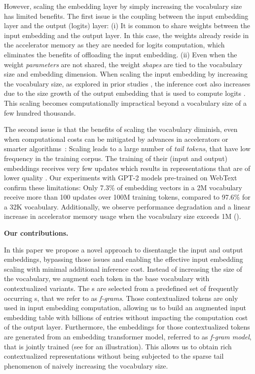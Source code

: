 However, scaling the embedding layer by simply increasing the vocabulary size has limited benefits. The first issue is the coupling between the input embedding layer and the output (logits) layer:  (i) It is common to share weights between the input embedding and the output layer. In this case, the weights already reside in the accelerator memory as they are needed for logits computation, which eliminates the benefits of offloading the input embedding. (ii) 
Even when the weight \emph{parameters} are not shared, the weight \emph{shapes} are tied to the vocabulary size and embedding dimension. When scaling the input embedding by increasing the vocabulary size, as explored in prior studies \citep{wang2019improving, zheng2021allocating, liang2023xlm, tao2024scaling}, the inference cost also increases due to the size growth of the output embedding that is used to  compute logits \citep{dagan2024getting}. This scaling becomes computationally impractical beyond a vocabulary size of a few hundred thousands. 

The second issue is that the benefits of scaling the vocabulary diminish, even when computational costs can be mitigated by advances in accelerators or smarter algorithms~\citep{joulin2017efficient,shim2017svd}: Scaling leads to a large number of \emph{tail tokens}, that have low frequency in the training corpus. The training of their (input and output) embeddings  receives very few updates which results in representations that are of lower quality \citep{liao2021efficient, dou2024sailor}.  
Our experiments with GPT-2 models \citep{radford2019language} pre-trained on WebText \citep{openwebtext} confirm these limitations: Only 7.3\% of embedding vectors in a 2M vocabulary receive more than 100 updates over 100M training tokens, compared to 97.6\% for a 32K vocabulary. Additionally, we observe performance degradation and a linear increase in accelerator memory usage when the vocabulary size exceeds 1M ().

\smallskip\noindent\textbf{Our contributions.}

In this paper we propose a novel approach to disentangle the input and output embeddings, bypassing those issues and enabling the effective input embedding scaling with minimal additional inference cost. Instead of increasing the size of the vocabulary, we augment each token in the base vocabulary with  contextualized variants. The s are selected from a predefined set of frequently occurring s, that we refer to as \emph{f-grams}. Those contextualized tokens are only used in input embedding computation, allowing us to build an augmented input embedding table with billions of entries without impacting the computation cost of the output layer. Furthermore, the embeddings for those contextualized tokens are generated from an embedding transformer model, referred to as \emph{f-gram model}, that is jointly trained (see  for an illustration). This allows us to obtain rich contextualized representations without being subjected to the sparse tail phenomenon of naively increasing the vocabulary size. 

